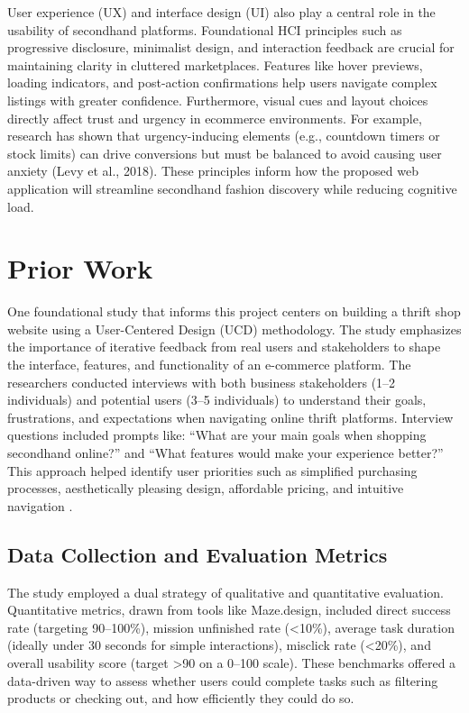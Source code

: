 \documentclass[10pt,twocolumn]{article}
\begin{document}
User experience (UX) and interface design (UI) also play a central role in the usability of secondhand platforms. Foundational HCI principles such as progressive disclosure, minimalist design, and interaction feedback are crucial for maintaining clarity in cluttered marketplaces. Features like hover previews, loading indicators, and post-action confirmations help users navigate complex listings with greater confidence. Furthermore, visual cues and layout choices directly affect trust and urgency in ecommerce environments. For example, research has shown that urgency-inducing elements (e.g., countdown timers or stock limits) can drive conversions but must be balanced to avoid causing user anxiety (Levy et al., 2018). These principles inform how the proposed web application will streamline secondhand fashion discovery while reducing cognitive load.


\section{Prior Work}
One foundational study that informs this project centers on building a thrift shop website using a User-Centered Design (UCD) methodology. The study emphasizes the importance of iterative feedback from real users and stakeholders to shape the interface, features, and functionality of an e-commerce platform. The researchers conducted interviews with both business stakeholders (1–2 individuals) and potential users (3–5 individuals) to understand their goals, frustrations, and expectations when navigating online thrift platforms. Interview questions included prompts like: “What are your main goals when shopping secondhand online?” and “What features would make your experience better?” This approach helped identify user priorities such as simplified purchasing processes, aesthetically pleasing design, affordable pricing, and intuitive navigation \cite{firmansyah2024}. 
\subsection{Data Collection and Evaluation Metrics
}The study employed a dual strategy of qualitative and quantitative evaluation. Quantitative metrics, drawn from tools like Maze.design, included direct success rate (targeting 90–100\%), mission unfinished rate (<10\%), average task duration (ideally under 30 seconds for simple interactions), misclick rate (<20\%), and overall usability score (target >90 on a 0–100 scale). These benchmarks offered a data-driven way to assess whether users could complete tasks such as filtering products or checking out, and how efficiently they could do so.
\end{document}
